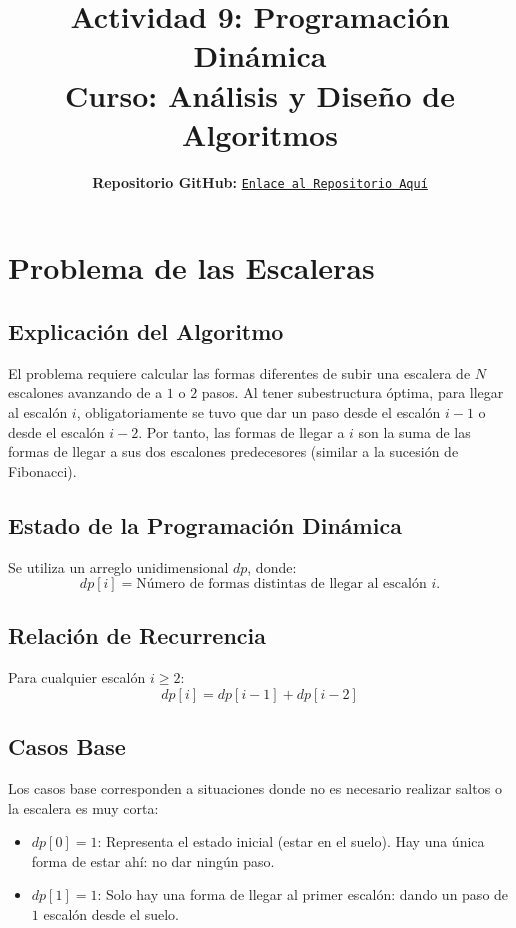 \documentclass[11pt, a4paper]{article}
\title{
    \vspace{-1.5cm}
    \textbf{\Large Actividad 9: Programación Dinámica} \\
    \large Curso: Análisis y Diseño de Algoritmos
}
\author{
    \textbf{Repositorio GitHub:} \href{https://github.com/ZapanaDiego/Analisis-y-Disenio-de-Algoritmos/tree/main/ProgramacionDinamicaActividad09}{\texttt{Enlace al Repositorio Aquí}}
}
\date{} %
\begin{document}
\maketitle

\section{Problema de las Escaleras}

\subsection{Explicación del Algoritmo}
El problema requiere calcular las formas diferentes de subir una escalera de $N$ escalones avanzando de a $1$ o $2$ pasos. Al tener subestructura óptima, para llegar al escalón $i$, obligatoriamente se tuvo que dar un paso desde el escalón $i-1$ o desde el escalón $i-2$. Por tanto, las formas de llegar a $i$ son la suma de las formas de llegar a sus dos escalones predecesores (similar a la sucesión de Fibonacci).

\subsection{Estado de la Programación Dinámica}
Se utiliza un arreglo unidimensional $dp$, donde:
\[
dp[i] = \text{Número de formas distintas de llegar al escalón } i.
\]

\subsection{Relación de Recurrencia}
Para cualquier escalón $i \ge 2$:
\[
dp[i] = dp[i-1] + dp[i-2]
\]

\subsection{Casos Base}
Los casos base corresponden a situaciones donde no es necesario realizar saltos o la escalera es muy corta:
\begin{itemize}
    \item $dp[0] = 1$: Representa el estado inicial (estar en el suelo). Hay una única forma de estar ahí: no dar ningún paso.
    \item $dp[1] = 1$: Solo hay una forma de llegar al primer escalón: dando un paso de $1$ escalón desde el suelo.
\end{itemize}
\end{document}
